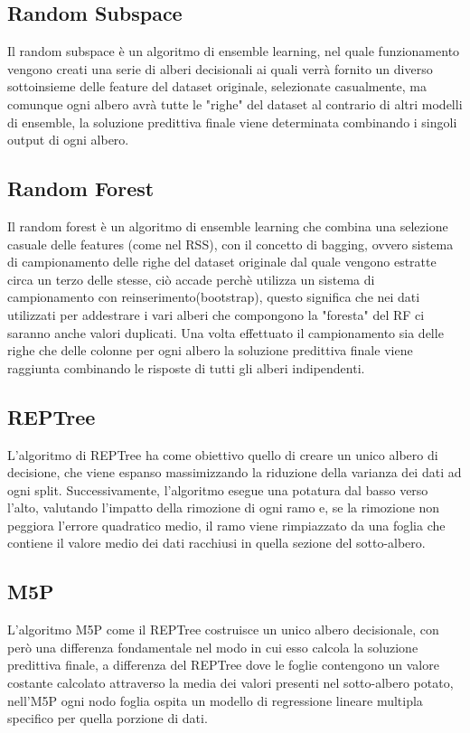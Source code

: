 \subsection{Random Subspace}
Il random subspace è un algoritmo di ensemble learning, nel quale funzionamento vengono creati una serie di alberi decisionali ai quali verrà fornito un diverso sottoinsieme delle feature del dataset originale, selezionate casualmente, ma comunque ogni albero avrà tutte le "righe" del dataset al contrario di altri modelli di ensemble, la soluzione predittiva finale viene determinata combinando i singoli output di ogni albero.

\subsection{Random Forest}
Il random forest è un algoritmo di ensemble learning che combina una selezione casuale delle features (come nel RSS), con il concetto di bagging, ovvero sistema di campionamento delle righe del dataset originale dal quale vengono estratte circa un terzo delle stesse, ciò accade perchè utilizza un sistema di campionamento con reinserimento(bootstrap), questo significa che nei dati utilizzati per addestrare i vari alberi che compongono la "foresta" del RF ci saranno anche valori duplicati. Una volta effettuato il campionamento sia delle righe che delle colonne per ogni albero la soluzione predittiva finale viene raggiunta combinando le risposte di tutti gli alberi indipendenti.

\subsection{REPTree}
L'algoritmo di REPTree ha come obiettivo quello di creare un unico albero di decisione, che viene espanso massimizzando la riduzione della varianza dei dati ad ogni split. Successivamente, l'algoritmo esegue una potatura dal basso verso l'alto, valutando l'impatto della rimozione di ogni ramo e, se la rimozione non peggiora l'errore quadratico medio, il ramo viene rimpiazzato da una foglia che contiene il valore medio dei dati racchiusi in quella sezione del sotto-albero.

\subsection{M5P}
L'algoritmo M5P come il REPTree costruisce un unico albero decisionale, con però una differenza fondamentale nel modo in cui esso calcola la soluzione predittiva finale, a differenza del REPTree dove le foglie contengono un valore costante calcolato attraverso la media dei valori presenti nel sotto-albero potato, nell'M5P ogni nodo foglia ospita un modello di regressione lineare multipla specifico per quella porzione di dati.

